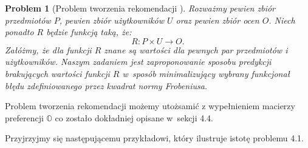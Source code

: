 \documentclass[12pt,a4paper]{report}
\newtheorem{problem}{Problem}[chapter]
\newcommand{\setUzytkownicy}{\mathit{U}}
\newcommand{\setPrzedmioty}{\mathit{P}}
\newcommand{\setOceny}{\mathit{O}}
\begin{document}
\begin{problem}[Problem tworzenia rekomendacji {\citep[Sec 1.3]{kidzinski}}]
Rozważmy pewien zbiór przedmiotów $\setPrzedmioty$, pewien zbiór użytkowników $\setUzytkownicy$ oraz pewien zbiór ocen $\setOceny$. Niech ponadto $R$ będzie funkcją taką, że:
$$ 
R: \setPrzedmioty \times \setUzytkownicy \to \setOceny .
$$
Załóżmy, że dla funkcji $R$ znane są wartości dla pewnych par przedmiotów i użytkowników. Naszym zadaniem jest zaproponowanie sposobu predykcji brakujących wartości funkcji $R$ w~sposób minimalizujący wybrany funkcjonał błędu zdefiniowanego przez kwadrat normy Frobeniusa. 
\end{problem}

Problem tworzenia rekomendacji możemy utożsamić z wypełnieniem macierzy preferencji $\mathbb{O}$ co zostało dokładniej opisane w~sekcji 4.4.
\bigskip

Przyjrzyjmy się następującemu przykładowi, który ilustruje istotę problemu 4.1.
\end{document}
